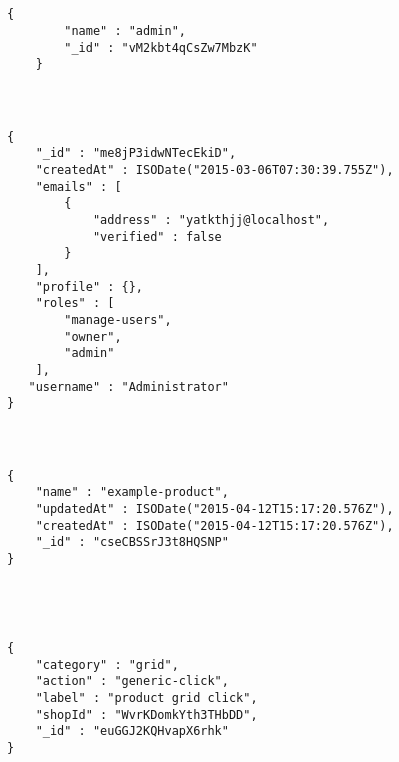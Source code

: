 \section{\rolCollection}

\medskip
\begin{lstlisting}[caption= \dataModelAS de \rolCollection, label=source:javascript:data_model_roll]
	{
	    "name" : "admin",
	    "_id" : "vM2kbt4qCsZw7MbzK"
	}
\end{lstlisting}



\section{\userscollection}

\medskip
\begin{lstlisting}[caption= \dataModelAS de \userscollection, label=source:javascript:data_model_user]

{
    "_id" : "me8jP3idwNTecEkiD",
    "createdAt" : ISODate("2015-03-06T07:30:39.755Z"),
    "emails" : [ 
        {
            "address" : "yatkthjj@localhost",
            "verified" : false
        }
    ],
    "profile" : {},
    "roles" : [ 
        "manage-users", 
        "owner", 
        "admin"
    ],
   "username" : "Administrator"
}
\end{lstlisting}

\section{\tagscollection}

\medskip
\begin{lstlisting}[caption= \dataModelAS de \tagscollection, label=source:javascript:data_model_tag]

{
    "name" : "example-product",
    "updatedAt" : ISODate("2015-04-12T15:17:20.576Z"),
    "createdAt" : ISODate("2015-04-12T15:17:20.576Z"),
    "_id" : "cseCBSSrJ3t8HQSNP"
}

\end{lstlisting}


\section{\analyEventcollection}

\medskip
\begin{lstlisting}[caption= \dataModelAS de \analyEventcollection, label=source:javascript:data_model_analy_event]


{
    "category" : "grid",
    "action" : "generic-click",
    "label" : "product grid click",
    "shopId" : "WvrKDomkYth3THbDD",
    "_id" : "euGGJ2KQHvapX6rhk"
}

\end{lstlisting}